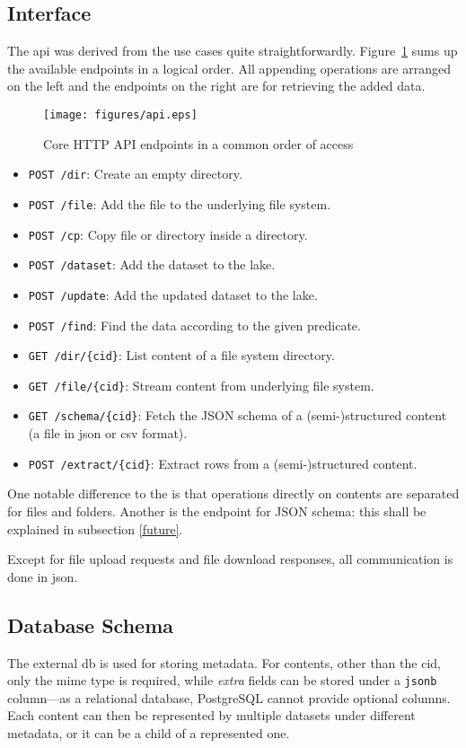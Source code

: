 \subsection{Interface}
The \gls{api} was derived from the use cases quite straightforwardly.
Figure~\ref{api} sums up the available endpoints in a logical order.
All appending operations are arranged on the left and the endpoints
on the right are for retrieving the added data.

\begin{figure}
  \texttt{[image: figures/api.eps]}
  \caption{Core HTTP API endpoints in a common order of access}
  \label{api}
\end{figure}

\begin{itemize}
  \item\verb|POST /dir|: Create an empty directory.
  \item\verb|POST /file|: Add the file to the underlying file system.
  \item\verb|POST /cp|: Copy file or directory inside a directory.
  \item\verb|POST /dataset|: Add the dataset to the lake.
  \item\verb|POST /update|: Add the updated dataset to the lake.
  \item\verb|POST /find|: Find the data according to the given predicate.
  \item\verb|GET /dir/{cid}|: List content of a file system directory.
  \item\verb|GET /file/{cid}|: Stream content from underlying file system.
  \item\verb|GET /schema/{cid}|: Fetch the JSON schema
    of a (semi-)structured content (a file in \gls{json} or \gls{csv} format).
  \item\verb|POST /extract/{cid}|: Extract rows from
    a (semi-)structured content.
\end{itemize}

One notable difference to the  is that operations directly
on contents are separated for files and folders.  Another is the endpoint
for JSON schema: this shall be explained in subsection \ref{future}.

Except for file upload requests and file download responses, all communication
is done in \gls{json}.

\subsection{Database Schema}
The external \gls{db} is used for storing metadata.  For \glspl{content},
other than the \gls{cid}, only the \gls{mime} type is required,
while \emph{extra} fields can be stored under a \verb|jsonb| column---as
a relational database, PostgreSQL cannot provide optional columns.
Each content can then be represented by multiple datasets under
different metadata, or it can be a child of a represented one.


